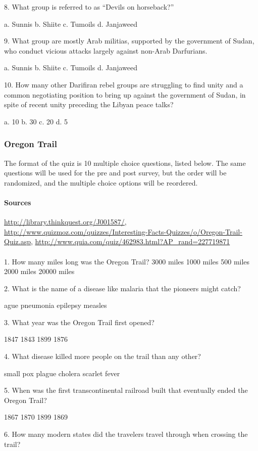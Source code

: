 8. What group is referred to as “Devils on horseback?”

a. Sunnis
b. Shiite
c. Tumoils
d. Janjaweed

9. What group are mostly Arab militias, supported by the government of Sudan, who conduct vicious attacks largely against non-Arab Darfurians. 

a. Sunnis
b. Shiite
c. Tumoils
d. Janjaweed

10. How many other Darifiran rebel groups are struggling to find unity and a common negotiating position to bring up against the government of Sudan, in spite of recent unity preceding the Libyan peace talks?

a. 10
b. 30
c. 20
d. 5
	\subsubsection{Oregon Trail}
		The format of the quiz is 10 multiple choice questions, listed below. The same questions will be used for the pre and post survey, but the order will be randomized, and the multiple choice options will be reordered.
		\paragraph{Sources} \url{http://library.thinkquest.org/J001587/}, \url{http://www.quizmoz.com/quizzes/Interesting-Facts-Quizzes/o/Oregon-Trail-Quiz.asp}, \url{http://www.quia.com/quiz/462983.html?AP_rand=227719871}
		\paragraph{} 1. How many miles long was the Oregon Trail?
3000 miles
1000 miles
500 miles
2000 miles
20000 miles

2. What is the name of a disease like malaria that the pioneers might catch?	

ague
pneumonia
epilepsy
measles

3. What year was the Oregon Trail first opened?

1847
1843
1899
1876

4. What disease killed more people on the trail than any other?

small pox
plague
cholera
scarlet fever

5. 	When was the first transcontinental railroad built that eventually ended the Oregon Trail?

1867
1870
1899
1869

6. How many modern states did the travelers travel through when crossing the trail?

